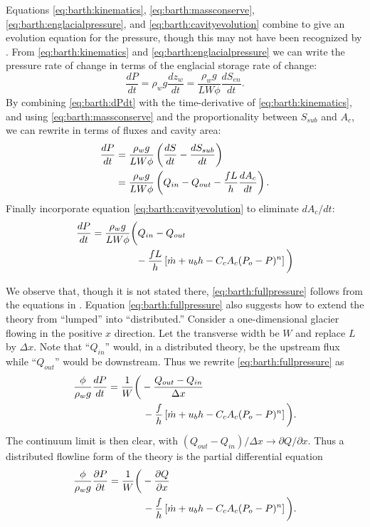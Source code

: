 \documentclass[twocolumn,letterpaper]{igs}
\begin{document}
Equations \eqref{eq:barth:kinematics}, \eqref{eq:barth:massconserve}, \eqref{eq:barth:englacialpressure}, and \eqref{eq:barth:cavityevolution} combine to give an evolution equation for the pressure, though this may not have been recognized by \cite{Bartholomausetal2011}.  From \eqref{eq:barth:kinematics} and \eqref{eq:barth:englacialpressure} we can write the pressure rate of change in terms of the englacial storage rate of change:
\begin{equation}
\frac{dP}{dt} = \rho_w g \frac{dz_w}{dt} = \frac{\rho_w g}{L W \phi} \frac{d S_{en}}{dt}. \label{eq:barth:dPdt}
\end{equation}
By combining \eqref{eq:barth:dPdt} with  the time-derivative of \eqref{eq:barth:kinematics}, and using \eqref{eq:barth:massconserve} and the proportionality between $S_{sub}$ and $A_c$, we can rewrite in terms of fluxes and cavity area:
\begin{align}
\frac{dP}{dt} &= \frac{\rho_w g}{L W \phi} \left(\frac{d S}{dt} - \frac{d S_{sub}}{dt}\right) \\
&= \frac{\rho_w g}{L W \phi} \left(Q_{in} - Q_{out} - \frac{f L }{h} \frac{d A_c}{dt}\right). \notag
\end{align}
Finally incorporate equation \eqref{eq:barth:cavityevolution} to eliminate $dA_c/dt$:
\begin{align}
&\frac{dP}{dt} = \frac{\rho_w g}{L W \phi} \bigg(Q_{in} - Q_{out} \label{eq:barth:fullpressure} \\
&\qquad \qquad \qquad - \frac{f L }{h} \left[\dot m + u_b h - C_c A_c (P_o-P)^n\right]\bigg) \notag
\end{align}

We observe that, though it is not stated there, \eqref{eq:barth:fullpressure} follows from the equations in \cite{Bartholomausetal2011}.  Equation \eqref{eq:barth:fullpressure} also suggests how to extend the \cite{Bartholomausetal2011} theory from ``lumped'' into ``distributed.''  Consider a one-dimensional glacier flowing in the positive $x$ direction.  Let the transverse width be $W$ and replace $L$ by $\Delta x$.  Note that ``$Q_{in}$'' would, in a distributed theory, be the upstream flux while ``$Q_{out}$'' would be downstream.  Thus we rewrite \eqref{eq:barth:fullpressure} as
\begin{align}
&\frac{\phi}{\rho_w g}\frac{dP}{dt} = \frac{1}{W} \bigg(- \frac{Q_{out} - Q_{in}}{\Delta x} \\
&\qquad \qquad \qquad \quad - \frac{f}{h} \left[\dot m + u_b h - C_c A_c (P_o-P)^n\right]\bigg). \notag
\end{align}
The continuum limit is then clear, with $(Q_{out} - Q_{in})/\Delta x \to \partial Q/\partial x$.  Thus a distributed flowline form of the \cite{Bartholomausetal2011} theory is the partial differential equation
\begin{align}
&\frac{\phi}{\rho_w g} \frac{\partial P}{\partial t} = \frac{1}{W} \bigg(- \frac{\partial Q}{\partial x}   \label{eq:barth:distpressure} \\
&\qquad \qquad \qquad \quad - \frac{f}{h} \left[\dot m + u_b h - C_c A_c (P_o-P)^n\right]\bigg). \notag
\end{align}
\end{document}
